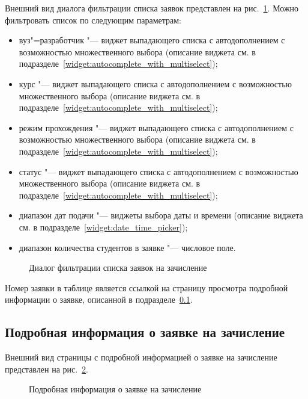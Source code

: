 Внешний вид диалога фильтрации списка заявок представлен на рис.~\ref{img:student:enroll_req_list_filter}.
Можно фильтровать список по следующим параметрам:
\begin{itemize}
	\item вуз"=разработчик "--- виджет выпадающего списка с автодополнением с возможностью множественного выбора 
	(описание виджета см. в подразделе~\ref{widget:autocomplete_with_multiselect});
	\item курс "--- виджет выпадающего списка с автодополнением с возможностью множественного выбора 
	(описание виджета см. в подразделе~\ref{widget:autocomplete_with_multiselect});
	\item режим прохождения "--- виджет выпадающего списка с автодополнением с возможностью множественного выбора 
	(описание виджета см. в подразделе~\ref{widget:autocomplete_with_multiselect});
	\item статус "--- виджет выпадающего списка с автодополнением с возможностью множественного выбора 
	(описание виджета см. в подразделе~\ref{widget:autocomplete_with_multiselect});
	\item диапазон дат подачи "--- виджеты выбора даты и времени 
	(описание виджета см. в подразделе~\ref{widget:date_time_picker});
	\item диапазон количества студентов в заявке "--- числовое поле.
\end{itemize}

\begin{figure}[H]
	\caption{Диалог фильтрации списка заявок на зачисление}
	\label{img:student:enroll_req_list_filter}
\end{figure}
Номер заявки в таблице является ссылкой на страницу просмотра подробной информации о заявке, 
описанной в подразделе~\ref{sec:enroll_req_detail}.

\subsection{Подробная информация о заявке на зачисление} \label{sec:enroll_req_detail}
Внешний вид страницы с подробной информацией о заявке на зачисление представлен на рис.~\ref{img:student:enroll_req_detail}.
\begin{figure}[H]
	\caption{Подробная информация о заявке на зачисление}
	\label{img:student:enroll_req_detail}
\end{figure}

